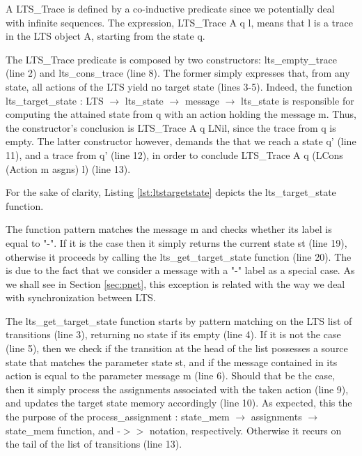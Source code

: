 	\noindent A \textsf{LTS\_Trace} is defined by a co-inductive predicate since we potentially deal
	with infinite sequences. The expression, \textsf{LTS\_Trace A q l}, means that \textsf{l} is a trace
	in the \textsf{LTS} object \textsf{A}, starting from the state \textsf{q}.   

		The \textsf{LTS\_Trace} predicate is composed by two constructors: \textsf{lts\_empty\_trace} (line 2)
	and \textsf{lts\_cons\_trace} (line 8).  The former simply expresses that, from any state, 
	all \textsf{actions} of the \textsf{LTS} yield no target state (lines 3-5). Indeed, the
	function 
	\textsf{lts\_target\_state : LTS $\rightarrow$ lts\_state $\rightarrow$ message $\rightarrow$ lts\_state}
	is responsible for computing the attained state from \textsf{q} with an \textsf{action} holding the message
	\textsf{m}. Thus, the constructor's conclusion is \textsf{LTS\_Trace A q LNil}, since the trace from \textsf{q}
	is empty.	The latter constructor however, demands the that we reach a state \textsf{q'} (line 11), and
	a trace from \textsf{q'} (line 12), in order to conclude \textsf{LTS\_Trace A q (LCons (Action m asgns) l)} (line 13).
	
		For the sake of clarity, Listing \ref{lst:ltstargetstate} depicts the \textsf{lts\_target\_state} function.	
	
					
	
	
	\noindent The function pattern matches the \textsf{message m} and checks whether its label
	is equal to \textsf{"-"}. If it is the case then it simply returns the current state \textsf{st} (line 19),
	otherwise it proceeds by calling the \textsf{lts\_get\_target\_state} function (line 20).
	The is due to the fact that we consider a \textsf{message} with a \textsf{"-"} label as
	a special case. As we shall see in Section \ref{sec:pnet}, this exception is related with the 
	way we deal with synchronization between \ac{LTS}.
	
	The \textsf{lts\_get\_target\_state} function starts by pattern matching on the \textsf{LTS}
	list of \textsf{transitions} (line 3),  returning no state if its empty (line 4). If it is not the 
	case (line 5), then we check if the \textsf{transition} at the head of the list possesses
	a source state that matches the parameter state \textsf{st}, and if the \textsf{message} contained
	in its \textsf{action} is equal to the parameter \textsf{message m} (line 6). Should that be the case,
	then it simply process the assignments associated with the taken \textsf{action} (line 9), and updates
	the target state memory accordingly (line 10). As expected, this the the purpose of the
	\textsf{process\_assignment : state\_mem $\rightarrow$ assignments $\rightarrow$ state\_mem} function, 
	and \textsf{-$>>$} notation, respectively. Otherwise it recurs on the tail of the list of 
	\textsf{transitions} (line 13).


